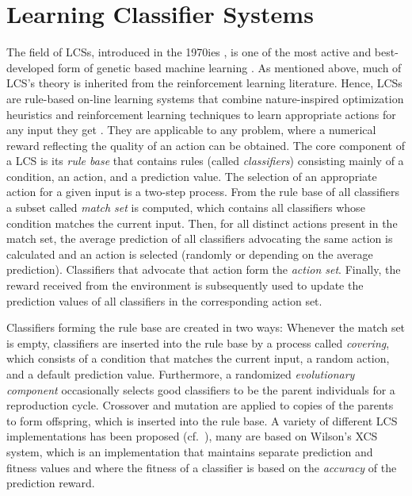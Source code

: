 \section{Learning Classifier Systems}
\label{section:learning-classifier-systems}

The field of LCSs, introduced in the 1970ies \cite{Hol75,Hol76,HR78}, is one of the most active and best-developed form of genetic based machine learning \cite{Kov02a,KL00,Lan08}. As mentioned above, much of LCS's theory is inherited from the reinforcement learning literature. %
Hence, LCSs are rule-based on-line learning systems that combine nature-inspired optimization heuristics and reinforcement learning techniques to learn appropriate actions for any input they get \cite{Wil95}. They are applicable to any problem, where a numerical reward reflecting the quality of an action can be obtained. The core component of a LCS is its \emph{rule base} that contains rules (called \emph{classifiers}) consisting mainly of a condition, an action, and a prediction value. The selection of an appropriate action for a given input is a two-step process. From the rule base of all classifiers a subset called \emph{match set} is computed, which contains all classifiers whose condition matches the current input. Then, for all distinct actions present in the match set, the average prediction of all classifiers advocating the same action is calculated and an action is selected (randomly or depending on the average prediction). Classifiers that advocate that action form the \emph{action set}.
Finally, the reward received from the environment is subsequently used to update the prediction values of all classifiers in the corresponding action set.

Classifiers forming the rule base are created in two ways: Whenever the match set is empty, classifiers are inserted into the rule base by a process called \emph{covering}, which consists of a condition that matches the current input, a random action, and a default prediction value. Furthermore, a randomized \emph{evolutionary component} occasionally selects %
good classifiers to be the parent individuals for a reproduction cycle. Crossover and mutation are applied to copies of the parents to form offspring, which is inserted into the rule base. A variety of different LCS implementations has been proposed (cf.~\cite{Kov02a}), many are based on Wilson's XCS \cite{Wil95} system, which is an implementation that maintains separate prediction and fitness values and where the fitness of a classifier is based on the \emph{accuracy} of the prediction reward.  

